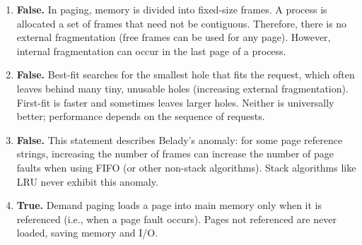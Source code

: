 \documentclass[11pt]{article}
\begin{document}
\begin{corrige}
\begin{enumerate}
\item \textbf{False.} In paging, memory is divided into fixed-size frames. A process is allocated a set of frames that need not be contiguous. Therefore, there is no external fragmentation (free frames can be used for any page). However, internal fragmentation can occur in the last page of a process.

\item \textbf{False.} Best-fit searches for the smallest hole that fits the request, which often leaves behind many tiny, unusable holes (increasing external fragmentation). First-fit is faster and sometimes leaves larger holes. Neither is universally better; performance depends on the sequence of requests.

\item \textbf{False.} This statement describes Belady's anomaly: for some page reference strings, increasing the number of frames can increase the number of page faults when using FIFO (or other non-stack algorithms). Stack algorithms like LRU never exhibit this anomaly.

\item \textbf{True.} Demand paging loads a page into main memory only when it is referenced (i.e., when a page fault occurs). Pages not referenced are never loaded, saving memory and I/O.
\end{enumerate}
\end{corrige}
\end{document}
